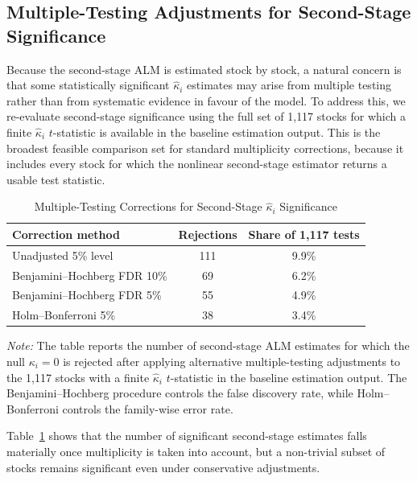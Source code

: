 \subsection{Multiple-Testing Adjustments for Second-Stage Significance}\label{app:multiple_testing}

Because the second-stage ALM is estimated stock by stock, a natural concern is that some statistically significant $\hat{\kappa}_i$ estimates may arise from multiple testing rather than from systematic evidence in favour of the model.
To address this, we re-evaluate second-stage significance using the full set of 1{,}117 stocks for which a finite $\hat{\kappa}_i$ $t$-statistic is available in the baseline estimation output.
This is the broadest feasible comparison set for standard multiplicity corrections, because it includes every stock for which the nonlinear second-stage estimator returns a usable test statistic.

\begin{table}[H]
\centering
\caption{Multiple-Testing Corrections for Second-Stage $\hat{\kappa}_i$ Significance}
\label{tab:multiple_testing}
\begin{tabular}{lcc}
\toprule
Correction method & Rejections & Share of 1,117 tests \\
\midrule
Unadjusted 5\% level & 111 & 9.9\% \\
Benjamini--Hochberg FDR 10\% & 69 & 6.2\% \\
Benjamini--Hochberg FDR 5\% & 55 & 4.9\% \\
Holm--Bonferroni 5\% & 38 & 3.4\% \\
\bottomrule
\end{tabular}
\medskip
\begin{minipage}{0.92\textwidth}
\footnotesize
\textit{Note:} The table reports the number of second-stage ALM estimates for which the null $\kappa_i = 0$ is rejected after applying alternative multiple-testing adjustments to the 1{,}117 stocks with a finite $\hat{\kappa}_i$ $t$-statistic in the baseline estimation output. The Benjamini--Hochberg procedure controls the false discovery rate, while Holm--Bonferroni controls the family-wise error rate.
\end{minipage}
\end{table}

Table~\ref{tab:multiple_testing} shows that the number of significant second-stage estimates falls materially once multiplicity is taken into account, but a non-trivial subset of stocks remains significant even under conservative adjustments.

